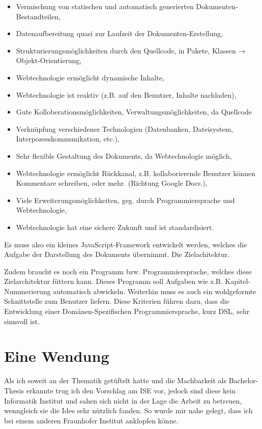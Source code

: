 \begin{itemize}
  \item Vermischung von statischen und automatisch generierten
        Doku\-menten-\-Be\-stand\-teilen,
  \item Datenaufbereitung quasi zur Laufzeit der Doku\-menten-\-Er\-stell\-ung,
  \item Strukturierungsmöglichkeiten durch den Quellcode, in Pakete, Klassen
        → Objekt-Orientierung,
  \item Webtechnologie ermöglicht dynamische Inhalte,
  \item Webtechnologie ist reaktiv (z.B. auf den Benutzer, Inhalte nachladen),
  \item Gute Kolloberationsmöglichkeiten, Verwaltungsmöglichkeiten,
        da Quellcode
  \item Verknüpfung verschiedener Technologien (Datenbanken, Dateisystem,
        Interpozesskommunikation, etc.),
  \item Sehr flexible Gestaltung des Dokuments, da Webtechnologie möglich,
  \item Webtechnologie ermöglicht Rückkanal, z.B. kollaborierende Benutzer
        können Kommentare schreiben, oder mehr. (Richtung Google Docs.),
  \item Viele Erweiterungsmöglichkeiten, geg. durch Programmiersprache und
        Webtechnologie,
  \item Webtechnologie hat eine sichere Zukunft und ist standardisiert.
\end{itemize}

Es muss also ein kleines JavaScript-Framework entwickelt werden, welches die
Aufgabe der Darstellung des Dokuments übernimmt. Die Zielachitektur.

Zudem braucht es noch ein Programm bzw. Programmiersprache, welches diese
Zielarchitektur füttern kann. Dieses Programm soll Aufgaben wie z.B.
Kapitel-Nummerierung automatisch abwickeln. Weiterhin muss es auch ein
wohlgeformte Schnittstelle zum Benutzer liefern. Diese Kriterien führen
dazu, dass die Entwicklung einer Domänen-Spezifischen Programmiersprache,
kurz DSL, sehr sinnvoll ist.

\section{Eine Wendung}

Als ich soweit an der Thematik getüftelt hatte und die Machbarkeit als
Bachelor-Thesis erkannte trug ich den Vorschlag am ISE vor, jedoch sind
diese kein Informatik Institut und sahen sich nicht in der Lage die Arbeit
zu betreuen, wenngleich sie die Idee sehr nützlich fanden. So wurde mir
nahe gelegt, dass ich bei einem anderen Fraunhofer Institut anklopfen könne.

